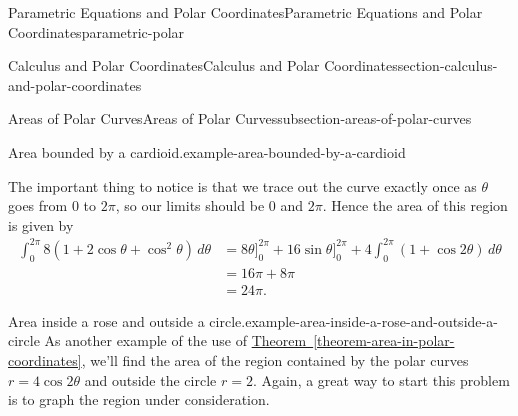 \documentclass[oneside,10pt,]{book}
\numberwithin{equation}{section}
\newcommand{\amp}{&}
\begin{document}
\begin{chapterptx}{Parametric Equations and Polar Coordinates}{}{Parametric Equations and Polar Coordinates}{}{}{parametric-polar}
\begin{sectionptx}{Calculus and Polar Coordinates}{}{Calculus and Polar Coordinates}{}{}{section-calculus-and-polar-coordinates}
\begin{subsectionptx}{Areas of Polar Curves}{}{Areas of Polar Curves}{}{}{subsection-areas-of-polar-curves}
\begin{example}{Area bounded by a cardioid.}{example-area-bounded-by-a-cardioid}
\begin{figure}
{
}
\end{figure}
\hypertarget{p-1051}{}%
The important thing to notice is that we trace out the curve exactly once as \(\theta\) goes from \(0\) to \(2\pi\), so our limits should be \(0\) and \(2\pi\). Hence the area of this region is given by%
%
\begin{align*}
\int_{0}^{2\pi}8(1+2\cos\theta+\cos^{2}\theta)\,d\theta \amp = 8\theta\Big]_{0}^{2\pi} + 16\sin\theta\Big]_{0}^{2\pi} + 4\int_{0}^{2\pi}(1+\cos2\theta)\,d\theta \\
\amp = 16\pi + 8\pi \\
\amp = 24\pi. 
\end{align*}
\end{example}
%
\begin{example}{Area inside a rose and outside a circle.}{example-area-inside-a-rose-and-outside-a-circle}%
\hypertarget{p-1052}{}%
As another example of the use of \hyperref[theorem-area-in-polar-coordinates]{Theorem~\ref{theorem-area-in-polar-coordinates}}, we'll find the area of the region contained by the polar curves \(r = 4\cos2\theta\) and outside the circle \(r=2\). Again, a great way to start this problem is to graph the region under consideration.%
\begin{figure}
\centering
{
}
\end{figure}
\end{example}
\end{subsectionptx}
\end{sectionptx}
\end{chapterptx}
\end{document}
